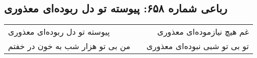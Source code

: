 \begin{center}
\section*{رباعی شماره ۶۵۸: پیوسته تو دل ربوده‌ای معذوری}
\label{sec:sh658}
\begin{longtable}{l p{0.5cm} r}
پیوسته تو دل ربوده‌ای معذوری
&&
غم هیچ نیازموده‌ای معذوری
\\
من بی تو هزار شب به خون در خفتم
&&
تو بی تو شبی نبوده‌ای معذوری
\\
\end{longtable}
\end{center}
